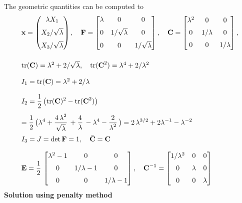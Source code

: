 The geometric quantities can be computed to
\begin{equation*}
  \begin{array}{lll}
    \bfx = \mat{\lambda X_1\\[2mm] X_2/\sqrt{\lambda} \\[2mm] X_3/\sqrt{\lambda}}, 
    \quad \bfF = \matt{\lambda & 0 & 0\\[2mm] 0 & 1/\sqrt{\lambda} & 0 \\[2mm] 0 & 0 & 1/\sqrt{\lambda}},
    \quad \bfC = \matt{\lambda^2 & 0 & 0\\[2mm] 0 & 1/\lambda & 0 \\[2mm] 0 & 0 & 1/\lambda },\\[12mm]
    \tr(\bfC) = \lambda^2 + 2/\sqrt{\lambda}, \quad \tr(\bfC^2) = \lambda^4 + 2/\lambda^2\\[4mm]
    I_1 = \tr(\bfC) = \lambda^2 + 2/\lambda \quad \\[4mm]
    I_2 = \dfrac12\big(\tr(\bfC)^2 - \tr(\bfC^2)\big) \\[4mm]
    = \dfrac{1}{2}\big(\lambda^4 + \dfrac{4\,\lambda^2}{\sqrt{\lambda}} + \dfrac{4}{\lambda} - \lambda^4 - \dfrac{2}{\lambda^2}\big)
    = 2\,\lambda^{3/2} + 2\lambda^{-1} - \lambda^{-2}\\[4mm]
    I_3 = J = \det{\bfF} = 1, \quad \bar{\bfC} = \bfC\\[4mm]
    \bfE = \dfrac12\matt{\lambda^2-1 & 0 & 0\\[2mm] 0 & 1/\lambda-1 & 0 \\[2mm] 0 & 0 & 1/\lambda-1}, \quad \bfC^{-1} = \matt{1/\lambda^2 & 0 & 0\\[2mm] 0 & \lambda & 0 \\[2mm] 0 & 0 & \lambda }
  \end{array}
\end{equation*}
\textbf{Solution using penalty method}

